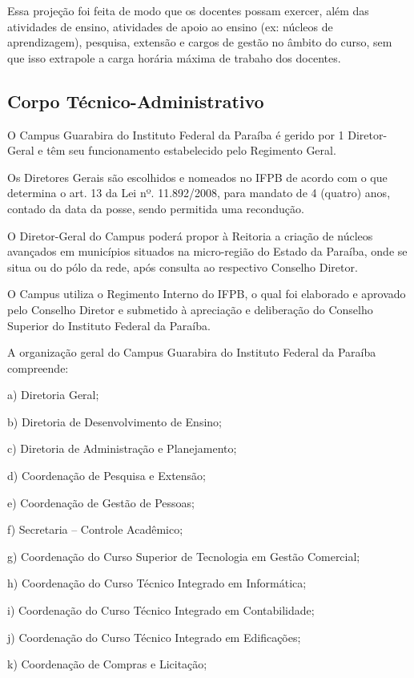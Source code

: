 Essa proje\c{c}\~ao foi feita de modo que os docentes possam exercer, al\'em das atividades de ensino, atividades de apoio ao ensino (ex: n\'ucleos de aprendizagem),  pesquisa, extens\~ao e cargos de gest\~ao no \^ambito do curso, sem que isso extrapole a carga hor\'aria m\'axima de trabaho dos docentes.

\subsection{Corpo T\'ecnico-Administrativo}

O Campus Guarabira do Instituto Federal da Paraíba é gerido por 1 Diretor-Geral e têm seu funcionamento estabelecido pelo Regimento Geral.

Os Diretores Gerais são escolhidos e nomeados no IFPB de acordo com o que determina o art. 13 da Lei nº. 11.892/2008, para mandato de 4 (quatro) anos, contado da data da posse, sendo permitida uma recondução.

O Diretor-Geral do Campus poderá propor à Reitoria a criação de núcleos avançados em municípios situados na micro-região do Estado da Paraíba, onde se situa ou do pólo da rede, após consulta ao respectivo Conselho Diretor.

O Campus utiliza o Regimento Interno do IFPB, o qual foi elaborado e aprovado pelo Conselho Diretor e submetido à apreciação e deliberação do Conselho Superior do Instituto Federal da Paraíba.

A organização geral do Campus Guarabira do Instituto Federal da Paraíba compreende:

a)	Diretoria Geral;

b)	Diretoria de Desenvolvimento de Ensino;

c)	Diretoria de Administração e Planejamento;

d)	Coordenação de Pesquisa e Extensão;

e)	Coordenação de Gestão de Pessoas;

f)	Secretaria – Controle Acadêmico;

g)	Coordenação do Curso Superior de Tecnologia em Gestão Comercial;

h)	Coordenação do Curso T\'ecnico Integrado em Inform\'atica;

i)	Coordenação do Curso T\'ecnico Integrado em Contabilidade;

j)	Coordenação do Curso T\'ecnico Integrado em Edifica\c{c}\~oes;

k)      Coordena\c{c}\~ao de Compras e Licita\c{c}\~ao;

